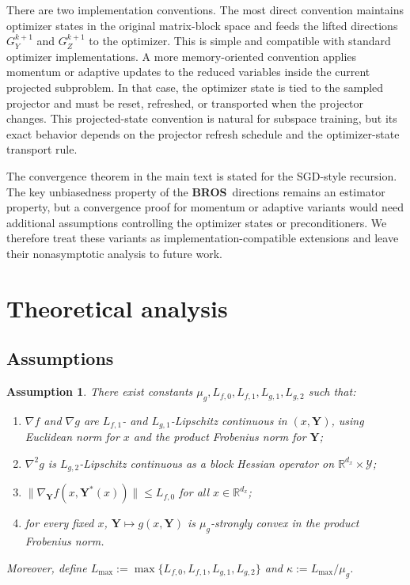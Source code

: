 \documentclass{pkumelon}
\theoremstyle{plain}
\newtheorem{assumption}{Assumption}
\newcommand{\R}{\mathbb{R}}
\newcommand{\oursname}{\textnormal{\textbf{BROS}}}
\newcommand{\ours}{\oursname\ }
\begin{document}
There are two implementation conventions. The most direct convention maintains optimizer states in the original matrix-block space and feeds the lifted directions $G_Y^{k+1}$ and $G_Z^{k+1}$ to the optimizer. This is simple and compatible with standard optimizer implementations. A more memory-oriented convention applies momentum or adaptive updates to the reduced variables inside the current projected subproblem. In that case, the optimizer state is tied to the sampled projector and must be reset, refreshed, or transported when the projector changes. This projected-state convention is natural for subspace training, but its exact behavior depends on the projector refresh schedule and the optimizer-state transport rule.

The convergence theorem in the main text is stated for the SGD-style recursion. The key unbiasedness property of the \ours directions remains an estimator property, but a convergence proof for momentum or adaptive variants would need additional assumptions controlling the optimizer states or preconditioners. We therefore treat these variants as implementation-compatible extensions and leave their nonasymptotic analysis to future work.


\section{Theoretical analysis}
\label{app:full_proofs}

\subsection{Assumptions}
\begin{assumption}\label{as:A1-1}
There exist constants $\mu_g, L_{f, 0}, L_{f, 1}, L_{g, 1}, L_{g, 2}$ such that:
\begin{enumerate}
\item $\nabla f$ and $\nabla g$ are $L_{f,1}$- and $L_{g,1}$-Lipschitz continuous in $(x,\boldsymbol{Y})$, using Euclidean norm for $x$ and the product Frobenius norm for $\boldsymbol{Y}$;
\item $\nabla^2 g$ is $L_{g,2}$-Lipschitz continuous as a block Hessian operator on $\R^{d_x}\times\mathcal Y$;
\item $\|\nabla_{\boldsymbol{Y}} f(x,\boldsymbol{Y}^*(x))\| \leq L_{f,0}$ for all $x\in\R^{d_x}$;
\item for every fixed $x$, $\boldsymbol{Y}\mapsto g(x,\boldsymbol{Y})$ is $\mu_g$-strongly convex in the product Frobenius norm.
\end{enumerate}
Moreover, define $L_{\max}:=\max \{L_{f,0}, L_{f,1}, L_{g,1}, L_{g,2}\}$ and $\kappa:=L_{\max} / \mu_g$.
\end{assumption}
\end{document}
